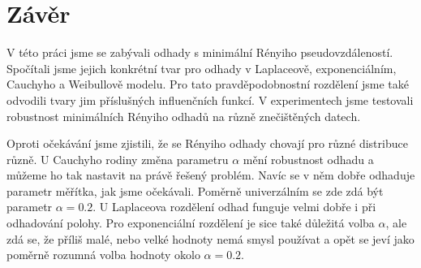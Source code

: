  \chapter*{Závěr}
 
 V této práci jsme se zabývali odhady s minimální Rényiho pseudovzdáleností. Spočítali jsme jejich konkrétní tvar pro odhady v Laplaceově, exponenciálním, Cauchyho a Weibullově modelu. Pro tato pravděpodobnostní rozdělení jsme také odvodili tvary jim příslušných influenčních funkcí. V experimentech jsme testovali robustnost minimálních Rényiho odhadů na různě znečištěných datech. 
 
Oproti očekávání jsme zjistili, že se Rényiho odhady chovají pro různé distribuce různě. U Cauchyho rodiny změna parametru $\alpha$ mění robustnost odhadu a můžeme ho tak nastavit na právě řešený problém.  Navíc se v něm dobře odhaduje parametr měřítka, jak jsme očekávali. Poměrně univerzálním se zde zdá být parametr $\alpha = 0.2$.  U Laplaceova rozdělení odhad funguje velmi dobře i při odhadování polohy. Pro exponenciální rozdělení je sice také důležitá volba $\alpha$, ale zdá se, že příliš malé, nebo velké hodnoty nemá smysl používat a opět se jeví jako poměrně rozumná volba hodnoty okolo $\alpha = 0.2$.